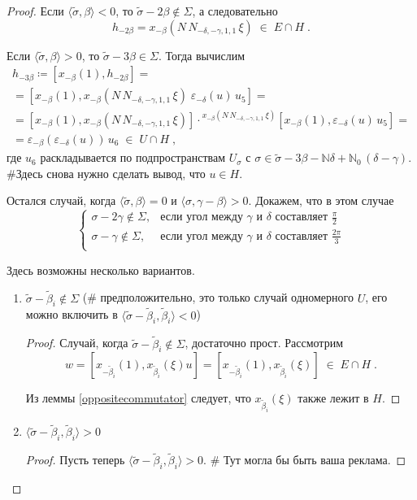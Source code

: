 \documentclass[10pt]{article}
\theoremstyle{remark}
\newcommand{\N}{\mathbb{N}}
\begin{document}
\begin{proof}
Если $\langle\widetilde\sigma,\beta\rangle<0$, то $\widetilde\sigma-2\beta\notin\Sigma$, а следовательно
$$h_{-2\beta} = x_{-\beta}(N \, N_{-\delta,-\gamma,1,1} \, \xi) \; \in \; E \cap H \;.$$

Если $\langle\widetilde\sigma,\beta\rangle>0$, то $\widetilde\sigma-3\beta\in\Sigma$. Тогда вычислим
\begin{multline*}
h_{-3\beta} \coloneqq [x_{-\beta}(1),h_{-2\beta}] = \\ =
[x_{-\beta}(1), x_{-\beta}(N \, N_{-\delta,-\gamma,1,1} \, \xi) \; \varepsilon_{-\delta}(u)\,u_5] = \\ =
[x_{-\beta}(1), x_{-\beta}(N \, N_{-\delta,-\gamma,1,1} \, \xi)] \cdot {}^{x_{-\beta}(N \, N_{-\delta,-\gamma,1,1} \, \xi)}[x_{-\beta}(1),\varepsilon_{-\delta}(u)\,u_5] = \\ =
\varepsilon_{-\beta}(\varepsilon_{-\delta}(u))\,u_6 \; \in \; U \cap H
 \; ,
\end{multline*}
где $u_6$ раскладывается по подпространствам $U_\sigma$ с $\sigma \in \widetilde\sigma-3\beta - \N\delta + \N_0 \, (\delta-\gamma)$. \#Здесь снова нужно сделать вывод, что $u\in H$.

Остался случай, когда $\langle\widetilde\sigma,\beta\rangle=0$ и $\langle\sigma,\gamma-\beta\rangle>0$. Докажем, что в этом случае 
$$
\begin{cases}
  \sigma-2\gamma\notin\Sigma,& \text{если угол между } \gamma \text{ и } \delta \text{ составляет } \frac{\pi}{2}\\
  \sigma-\gamma\notin\Sigma,              & \text{если угол между } \gamma \text{ и } \delta \text{ составляет } \frac{2\pi}{3}\\
\end{cases}$$

\pagebreak

Здесь возможны несколько вариантов.
\begin{enumerate}
\item $\widetilde\sigma - \widetilde\beta_i \notin \Sigma$ (\# предположительно, это только случай одномерного $U$, его можно включить в $\langle\widetilde\sigma-\widetilde\beta_i,\widetilde\beta_i\rangle < 0$)
\begin{proof}
Случай, когда $\widetilde\sigma - \widetilde\beta_i \notin \Sigma$, достаточно прост. Рассмотрим
$$ w = [x_{-\widetilde\beta_i}(1),x_{\widetilde\beta_i}(\xi)u] = [x_{-\widetilde\beta_i}(1),x_{\widetilde\beta_i}(\xi)] \; \in \; E \cap H \;.$$

Из леммы \ref{oppositecommutator} следует, что $x_{\widetilde\beta_i}(\xi)$ также лежит в $H$.
\end{proof}
\item $\langle\widetilde\sigma - \widetilde\beta_i, \widetilde\beta_i\rangle > 0$
\begin{proof}
Пусть теперь $\langle\widetilde\sigma - \widetilde\beta_i, \widetilde\beta_i\rangle > 0$. \# Тут могла бы быть ваша реклама.
\end{proof}




\end{enumerate}
\end{proof}
\end{document}
